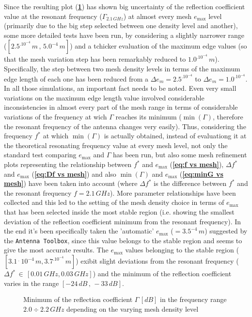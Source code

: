 \documentclass[10 pt,a4paper,twocolumn]{article}
\begin{document}
{Since the resulting plot  (\textbf{\cref{fig:first mesh test}}) has shown big uncertainty of the reflection coefficient value at the resonant frequency ($\Gamma_{2.1\,GHz}$) at almost every mesh $e_{\max}$ level (primarily due to the big step selected between one density level and another), some more detailed tests have been run, by considering a slightly narrower range ($[2.5^.10^{-4}\,m\,,\,5.0^{-4}\,m]$) and a tchicker evaluation of the maximum edge values (so that the mesh variation step has been remarkably reduced to $1.0^.10^{-4}\,m$). Specifically, the step between two mesh density levels in terms of the maximum edge length of each one has been reduced from a $\Delta e_m=2.5^.10^{-4}$ to $\Delta e_m=1.0^.10^{-4}$. In all those simulations, an important fact needs to be noted. Even very small variations on the maximum edge length value involved considerable inconsistencies in almost every part of the mesh range in terms of considerable variations of the frequency at wich $\Gamma$ reaches its minimum ($\min(\Gamma)$, therefore the resonant frequency of the antenna changes very easily).  
Thus, considering the frequency $f^*$ at which $\min(\Gamma)$ is actually obtained, instead of evaluationg it at the theoretical resonating frequency value at every mesh level, not only the standard test comparing $e_{\max}$ and $\Gamma$ has been run, but also some mesh refinement plots representing the relationship between $f^*$ and $e_{\max}$ (\textbf{\cref{eq:f vs mesh}}), $\Delta f^*$ and $e_{\max}$ (\textbf{\cref{eq:Df vs mesh}}) and also $\min(\Gamma)$ and $e_{\max}$ (\textbf{\cref{eq:minG vs mesh}}) have been taken into account (where $\Delta f^*$ is the difference between $f^*$ and the resonant frequency $f=2.1\,GHz$). More parameter relationships have been collected and this led to the setting of the mesh density choice in terms of $e_{\max}$ that has been selected inside the most stable region (i.e. showing the smallest deviation of the reflection coefficient minimum from the resonant frequency). In the end it's been specifically taken the 'automatic' $e_{\max}$ ($=3.5^{-4}\,m$) suggested by the \texttt{\color{Mahogany}Antenna Toolbox}, since this value  belongs to the stable region and seems to give the most accurate results. The $e_{\max}$ values belonging to the stable region ($[3.1\,^.\,10^{-4}\,m,3.7^.10^{-4}\,m]$) exibit slight deviations from the resonant frequency ($\Delta f^*\,\in\,[0.01\,GHz,0.03\,GHz]$) and the minimum of the reflection coefficient varies in the range $[-24\,dB\,,\,-33\,dB]$. 
\begin{figure}[bt!]
	\def\svgwidth{\linewidth}
	\tiny{}
	\hfill
	\caption{{Minimum of the reflection coefficient $\Gamma\, [dB]$ in the frequency range $2.0\div 2.2\,GHz$ depending on the varying mesh density level}}
	\label{fig:first mesh test}
\end{figure}


}
\end{document}
